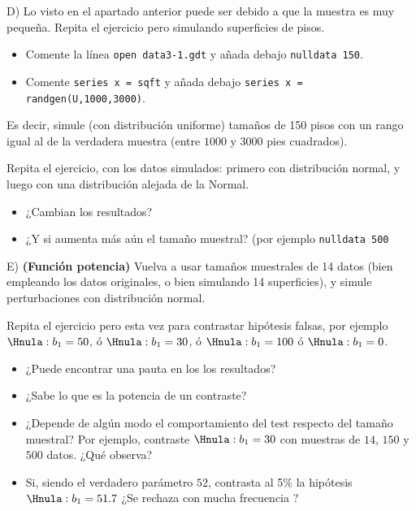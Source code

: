 \documentclass[11pt]{article}
\begin{document}
D) Lo visto en el apartado anterior puede ser debido a que la muestra
   es muy pequeña. Repita el ejercicio pero simulando superficies de
   pisos.

\begin{itemize}
\item Comente la línea \texttt{open data3-1.gdt} y añada debajo \texttt{nulldata
     150}.

\item Comente \texttt{series x = sqft} y añada debajo \texttt{series x =
     randgen(U,1000,3000)}.
\end{itemize}

Es decir, simule (con distribución uniforme) tamaños de 150 pisos
con un rango igual al de la verdadera muestra (entre \(1000\) y \(3000\)
pies cuadrados).

Repita el ejercicio, con los datos simulados: primero con
distribución normal, y luego con una distribución alejada de la
Normal.

\begin{itemize}
\item ¿Cambian los resultados?

\item ¿Y si aumenta más aún el tamaño muestral? (por ejemplo \texttt{nulldata
     500}
\end{itemize}

E) \textbf{(Función potencia)} Vuelva a usar tamaños muestrales de 14 datos
   (bien empleando los datos originales, o bien simulando 14
   superficies), y simule perturbaciones con distribución normal.

Repita el ejercicio pero esta vez para contrastar hipótesis falsas,
por ejemplo \(\Hnula: b_1=50\), ó \(\Hnula: b_1=30\), ó \(\Hnula:
   b_1=100\) ó \(\Hnula: b_1=0\).

\begin{itemize}
\item ¿Puede encontrar una pauta en los los resultados?

\item ¿Sabe lo que es la potencia de un contraste?

\item ¿Depende de algún modo el comportamiento del test respecto del
tamaño muestral? Por ejemplo, contraste \(\Hnula: b_1=30\) con
muestras de \(14\), \(150\) y \(500\) datos. ¿Qué observa?

\item Si, siendo el verdadero parámetro \(52\), contrasta al 5\% la
hipótesis \(\Hnula: b_1=51.7\) ¿Se rechaza con mucha frecuencia
\Hnula?
\end{itemize}
\end{document}

